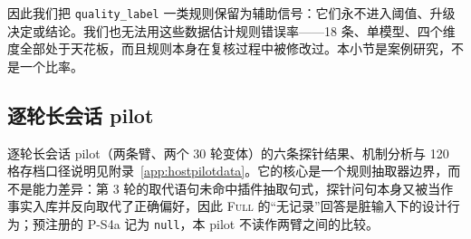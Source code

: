 因此我们把 \texttt{quality\_label} 一类规则保留为辅助信号：它们永不进入阈值、升级决定或结论。我们也无法用这些数据估计规则错误率——18 条、单模型、四个维度全部处于天花板，而且规则本身在复核过程中被修改过。本小节是案例研究，不是一个比率。

\subsection{逐轮长会话 pilot}

逐轮长会话 pilot（两条臂、两个 30 轮变体）的六条探针结果、机制分析与 120 格存档口径说明见附录~\ref{app:hostpilotdata}。它的核心是一个规则抽取器边界，而不是能力差异：第 3 轮的取代语句未命中插件抽取句式，探针问句本身又被当作事实入库并反向取代了正确偏好，因此 \textsc{Full} 的“无记录”回答是脏输入下的设计行为；预注册的 P-S4a 记为 \texttt{null}，本 pilot 不读作两臂之间的比较。
